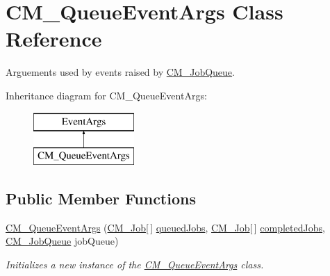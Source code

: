 \hypertarget{class_c_m___queue_event_args}{}\section{C\+M\+\_\+\+Queue\+Event\+Args Class Reference}
\label{class_c_m___queue_event_args}


Arguements used by events raised by \hyperlink{class_c_m___job_queue}{C\+M\+\_\+\+Job\+Queue}.  


Inheritance diagram for C\+M\+\_\+\+Queue\+Event\+Args\+:\begin{figure}[H]
\begin{center}
\leavevmode
\includegraphics[height=2.000000cm]{class_c_m___queue_event_args}
\end{center}
\end{figure}
\subsection*{Public Member Functions}
\begin{DoxyCompactItemize}
\item 
\hyperlink{class_c_m___queue_event_args_a4345d4c604133866fab4bfd40143f70b}{C\+M\+\_\+\+Queue\+Event\+Args} (\hyperlink{class_c_m___job}{C\+M\+\_\+\+Job}\mbox{[}$\,$\mbox{]} \hyperlink{class_c_m___queue_event_args_a9a7016a83b4d77bfede3932565c13704}{queued\+Jobs}, \hyperlink{class_c_m___job}{C\+M\+\_\+\+Job}\mbox{[}$\,$\mbox{]} \hyperlink{class_c_m___queue_event_args_a89e1c990b52231168f5534204edfa25a}{completed\+Jobs}, \hyperlink{class_c_m___job_queue}{C\+M\+\_\+\+Job\+Queue} job\+Queue)
\begin{DoxyCompactList}\small\item\em Initializes a new instance of the \hyperlink{class_c_m___queue_event_args}{C\+M\+\_\+\+Queue\+Event\+Args} class. \end{DoxyCompactList}\end{DoxyCompactItemize}
